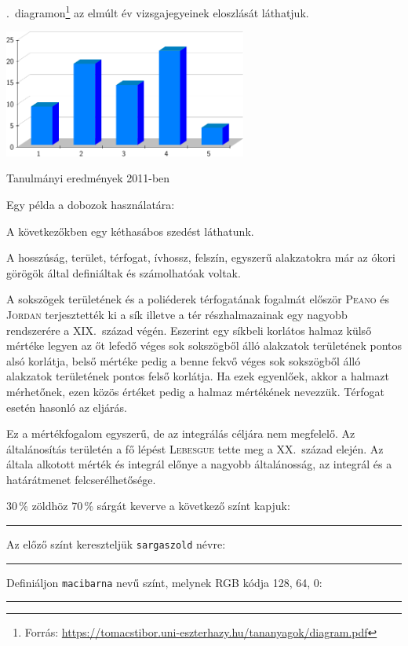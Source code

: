 \documentclass[a4paper,12pt]{article}
\begin{document}
	
	\Az{\ref{fig-diagram}}.~diagramon\footnote{Forrás: \url{https://tomacstibor.uni-eszterhazy.hu/tananyagok/diagram.pdf}} az elmúlt év vizsgajegyeinek eloszlását láthatjuk.
	\begin{diagram} [ht!]
		\centering
		\includegraphics[width=8cm] {diagram}
		\caption{Tanulmányi eredmények 2011-ben}
		\label{fig-diagram}
	\end{diagram}
	
	Egy példa a dobozok használatára:
	
	 \begin{center}
	 \end{center}
	 
	 A következőkben egy kéthasábos szedést láthatunk.
	 
	 \begin{multicols}{2}
	 	A hosszúság, terület, térfogat, ívhossz, felszín, egyszerű alakzatokra
	 	már az ókori görögök által definiáltak
	 	és számolhatóak voltak.
	 	
	 	A sokszögek területének és a poliéderek térfogatának fogalmát először
	 	\textsc{Peano} és \textsc{Jordan} terjesztették ki a
	 	sík illetve a tér részhalmazainak egy
	 	nagyobb rendszerére a XIX.~század
	 	végén. Eszerint egy síkbeli korlátos
	 	halmaz külső mértéke legyen az őt lefedő véges sok sokszögből álló alakzatok területének pontos alsó korlátja, belső mértéke pedig a benne fekvő véges sok sokszögből álló alakzatok területének pontos felső korlátja.
	 	Ha ezek egyenlőek, akkor a halmazt
	 	mérhetőnek, ezen közös értéket pedig
	 	a halmaz mértékének nevezzük. Térfogat esetén hasonló az eljárás.
	 	
	 	Ez a mértékfogalom egyszerű, de
	 	az integrálás céljára nem megfelelő.
	 	Az általánosítás területén a fő lépést
	 	\textsc{Lebesgue} tette meg a XX.~század
	 	elején. Az általa alkotott mérték és
	 	integrál előnye a nagyobb általánosság, az integrál és a határátmenet felcserélhetősége.	 	
	 \end{multicols}
	 {\color{blue}30\,\% zöldhöz 70\,\% sárgát keverve a következő színt kapjuk: {\color{green!30!yellow}\rule{10mm}{3mm}} Az előző színt kereszteljük \texttt{sargaszold} névre: {\color{sargaszold}\rule{10mm}{3mm}} Definiáljon \texttt{macibarna} nevű színt, melynek RGB kódja 128, 64, 0: {\color{macibarna}\rule{10mm}{3mm}}}
	 
	 
\end{document}
